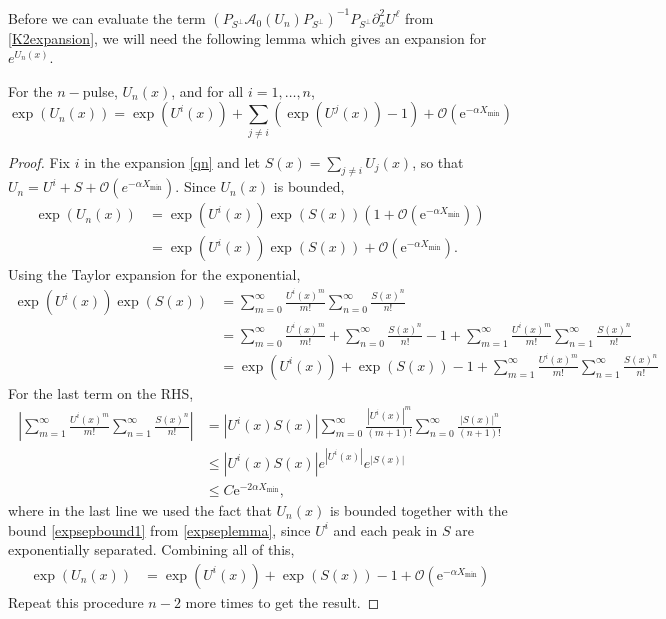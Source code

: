 \documentclass[review,onefignum,onetabnum]{siamart171218}
\def\exp{\mathop\mathrm{exp}\nolimits}
\newcommand{\rme}{\mathrm{e}}
\newcommand{\calA}{\mathcal{A}}
\begin{document}
Before we can evaluate the term $(P_{S^\perp} \calA_0(U_n)P_{S^\perp})^{-1} P_{S^\perp}\partial_x^2U^\ell$ from \cref{K2expansion}, we will need the following lemma which gives an expansion for $e^{U_n(x)}$.


\begin{lemma}\label{expsep}
For the $n-$pulse, $U_n(x)$, and for all $i = 1, \dots, n$,
\[%
\exp(U_n(x)) = \exp( U^i(x)) + \sum_{j \neq i} (\exp(U^j(x)) - 1) + \mathcal{O}(\rme^{-\alpha X_{\mathrm{min}}})
\]%
\end{lemma}

\begin{proof}
Fix $i$ in the expansion \eqref{qn} and let $S(x) = \sum_{j \neq i} U_j(x)$, so that $U_n = U^i + S + \mathcal{O}(e^{-\alpha X_{\mathrm{min}}})$. Since $U_n(x)$ is bounded,
\[
\begin{aligned}
\exp(U_n(x)) &= \exp( U^i(x) )\exp(S(x))(1 + \mathcal{O}(\rme^{-\alpha X_{\mathrm{min}}})) \\
&= \exp( U^i(x) )\exp(S(x)) + \mathcal{O}(\rme^{-\alpha X_{\mathrm{min}}}).
\end{aligned}
\]
Using the Taylor expansion for the exponential,
\[
\begin{aligned}
\exp( U^i(x) )\exp(S(x))
&= \sum_{m=0}^\infty \frac{U^i(x)^m}{m!}
\sum_{n=0}^\infty \frac{S(x)^n}{n!} \\
&= \sum_{m=0}^\infty \frac{U^i(x)^m}{m!}
+ \sum_{n=0}^\infty\frac{S(x)^n}{n!} - 1 +
\sum_{m=1}^\infty \frac{U^i(x)^m}{m!}
\sum_{n=1}^\infty \frac{S(x)^n}{n!} \\
&= \exp(U^i(x)) + \exp(S(x)) - 1 +
\sum_{m=1}^\infty \frac{U^i(x)^m}{m!}
\sum_{n=1}^\infty \frac{S(x)^n}{n!}
\end{aligned}
\]
For the last term on the RHS,
\[
\begin{aligned}
\left| \sum_{m=1}^\infty \frac{U^i(x)^m}{m!} \sum_{n=1}^\infty \frac{S(x)^n}{n!} \right|
&= \left| U^i(x)S(x)\right| \sum_{m=0}^\infty \frac{|U^i(x)|^m}{(m+1)!} \sum_{n=0}^\infty \frac{|S(x)|^n}{(n+1)!} \\
&\leq \left| U^i(x)S(x) \right| e^{|U^i(x)|}e^{|S(x)|} \\
&\leq C \rme^{-2 \alpha X_{\mathrm{min}}},
\end{aligned}
\]
where in the last line we used the fact that $U_n(x)$ is bounded together with the bound \cref{expsepbound1} from \cref{expseplemma}, since $U^i$ and each peak in $S$ are exponentially separated. Combining all of this,
\[
\begin{aligned}
\exp(U_n(x)) &= \exp(U^i(x)) + \exp(S(x)) - 1 + \mathcal{O}(\rme^{-\alpha X_{\mathrm{min}}})
\end{aligned}
\]
Repeat this procedure $n - 2$ more times to get the result.
\end{proof}
\end{document}

